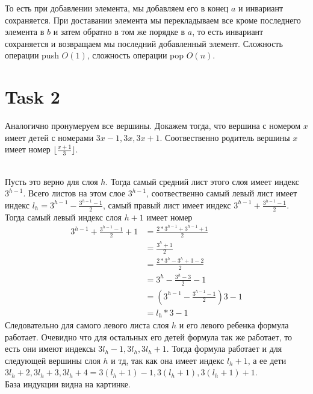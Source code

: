 \documentclass[12pt]{exam}
\begin{document}
То есть при добавлении элемента, мы добавляем его в конец $a$ и инвариант сохраняется.
При доставании элемента мы перекладываем все кроме последнего элемента в $b$ и 
затем обратно в том же порядке в $a$, то есть инвариант сохраняется и возвращаем мы последний добавленный элемент.
Сложность операции push $O(1)$, сложность операции pop $O(n)$.

\section*{Task 2}
Аналогично пронумеруем все вершины.
Докажем тогда, что вершина с номером $x$ имеет детей с номерами $3x - 1, 3x, 3x + 1$.
Соотвественно родитель вершины $x$ имеет номер $\lfloor \frac{x + 1}{3} \rfloor$.

\\
Пусть это верно для слоя $h$. 
Тогда самый средний лист этого слоя имеет индекс $3^{h - 1}$. 
Всего листов на этом слое $3^{h - 1}$, 
соотвественно самый левый лист имеет индекс $l_h = 3^{h - 1} - \frac{3^{h - 1} - 1}{2}$, 
самый правый лист имеет индекс $3^{h - 1} + \frac{3^{h - 1} - 1}{2}$. \\
Тогда самый левый индекс слоя $h + 1$ имеет номер 
\begin{align*}
    3^{h - 1} + \frac{3^{h - 1} - 1}{2} + 1 
        &= \frac{2 * 3^{h - 1} + 3^{h - 1} + 1}{2} \\
        &= \frac{3^h + 1}{2} \\
        &= \frac{2 * 3^h - 3^h + 3 - 2}{2} \\
        &= 3^h - \frac{3^h - 3}{2} - 1 \\
        &= \left( 3^{h - 1} - \frac{3^{h - 1} - 1}{2} \right) 3 - 1\\
        &= l_h * 3 - 1
\end{align*}
Следовательно для самого левого листа слоя $h$ и его левого ребенка формула работает.
Очевидно что для остальных его детей формула так же работает, 
то есть они имеют индексы $3 l_h -1, 3 l_h, 3 l_h + 1$. 
Тогда формула работает и для следующей вершины слоя $h$ и тд, так как она имеет индекс 
$l_h + 1$, а ее дети $3l_h + 2, 3l_h + 3, 3l_h + 4 = 3(l_h + 1) - 1, 3(l_h + 1), 3(l_h + 1) + 1$.\\
База индукции видна на картинке. 
\end{document}
